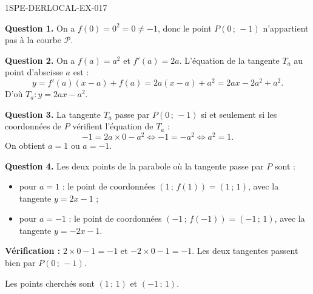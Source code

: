 \begin{corrige}{1SPE-DERLOCAL-EX-017}

\textbf{Question 1.} On a $f(0) = 0^2 = 0
\neq -1$, donc le point $P(0\,;\,-1)$ n'appartient pas à la courbe $\mathcal{P}$.

\textbf{Question 2.} On a $f(a) = a^2$ et $f'(a) = 2a$. L'équation de la tangente $T_a$ au point d'abscisse $a$ est :
\[
y = f'(a)(x - a) + f(a) = 2a(x - a) + a^2 = 2ax - 2a^2 + a^2.
\]
D'où $\boxed{T_a : y = 2ax - a^2}$.

\textbf{Question 3.} La tangente $T_a$ passe par $P(0\,;\,-1)$ si et seulement si les coordonnées de $P$ vérifient l'équation de $T_a$ :
\[
-1 = 2a \times 0 - a^2 \iff -1 = -a^2 \iff a^2 = 1.
\]
On obtient $a = 1$ ou $a = -1$.

\textbf{Question 4.} Les deux points de la parabole où la tangente passe par $P$ sont :
\begin{itemize}
  \item pour $a = 1$ : le point de coordonnées $(1\,;\,f(1)) = (1\,;\,1)$, avec la tangente $y = 2x - 1$ ;
  \item pour $a = -1$ : le point de coordonnées $(-1\,;\,f(-1)) = (-1\,;\,1)$, avec la tangente $y = -2x - 1$.
\end{itemize}

\textbf{Vérification :} $2 \times 0 - 1 = -1$ et $-2 \times 0 - 1 = -1$. Les deux tangentes passent bien par $P(0\,;\,-1)$. \checkmark

Les points cherchés sont $\boxed{(1\,;\,1)}$ et $\boxed{(-1\,;\,1)}$.

\end{corrige}
